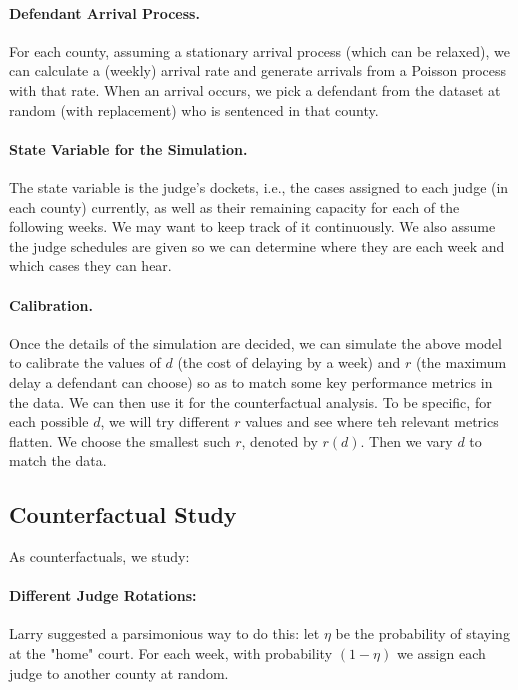 \documentclass[11pt, oneside]{article}   	%
\theoremstyle{ModifiedStyle}
\begin{document}
\paragraph{Defendant Arrival Process.} For each county, assuming a stationary arrival process (which can be relaxed), we can calculate a (weekly) arrival rate and generate arrivals from a Poisson process with that rate. When an arrival occurs, we pick a defendant from the dataset at random (with replacement) who is sentenced in that county.
%
\vspace{-3mm}
\paragraph{State Variable for the Simulation.} The state variable is the judge's dockets, i.e., the cases assigned to each judge (in each county) currently, as well as their remaining capacity for each of the following weeks. We may want to keep track of it continuously. We also assume the judge schedules are given so we can determine where they are each week and which cases they can hear.


%
\vspace{-3mm}
\paragraph{Calibration.} Once the details of the simulation are decided, we can simulate the above model to calibrate the values of $d$ (the cost of delaying by a week) and $r$ (the maximum delay a defendant can choose) so as to match some key performance metrics in the data. We can then use it for the counterfactual analysis. To be specific, for each possible $d$, we will try different $r$ values and see where teh relevant metrics flatten. We choose the smallest such $r$, denoted by $r(d)$. Then we vary $d$ to match the data.


%
\subsection{Counterfactual Study}
As counterfactuals, we study:

\paragraph{Different Judge Rotations:} Larry suggested a parsimonious way to do this: let $\eta$ be the probability of staying at the "home" court. For each week, with probability $(1-\eta)$ we assign each judge to another county at random.
\end{document}
